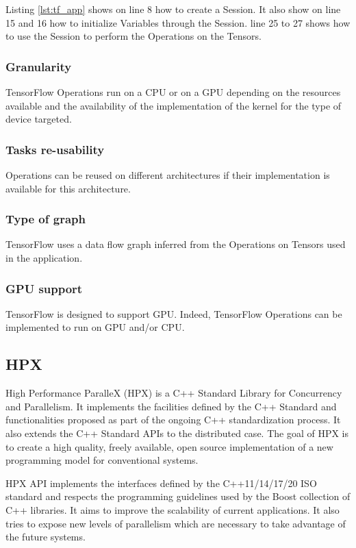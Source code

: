 Listing \ref{lst:tf_app} shows on line 8 how to create a Session.
It also show on line 15 and 16 how to initialize Variables through the Session.
line 25 to 27 shows how to use the Session to perform the Operations on the Tensors.


\subsubsection{Granularity}
TensorFlow Operations run on a CPU or on a GPU depending on the resources available and the availability of the implementation of the kernel for the type of device targeted.

\subsubsection{Tasks re-usability}
Operations can be reused on different architectures if their implementation is available for this architecture.

\subsubsection{Type of graph}
TensorFlow uses a data flow graph inferred from the Operations on Tensors used in the application.

\subsubsection{GPU support}
TensorFlow is designed to support GPU.
Indeed, TensorFlow Operations can be implemented to run on GPU and/or CPU.





\subsection{HPX}
High Performance ParalleX (HPX) \cite{KHASF2014} \cite{KAHBS2019} is a C++ Standard Library for Concurrency and Parallelism.
It implements the facilities defined by the C++ Standard and functionalities proposed as part of the ongoing C++ standardization process.
It also extends the C++ Standard APIs to the distributed case.
The goal of HPX is to create a high quality, freely available, open source implementation of a new programming model for conventional systems.

HPX API implements the interfaces defined by the C++11/14/17/20 ISO standard and respects the programming guidelines used by the Boost collection of C++ libraries.
It aims to improve the scalability of current applications.
It also tries to expose new levels of parallelism which are necessary to take advantage of the future systems.

